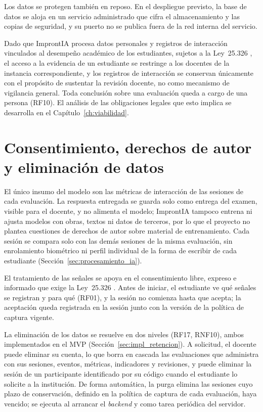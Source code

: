 Los datos se protegen también en reposo. En el despliegue previsto, la base de datos se aloja en un servicio administrado que cifra el almacenamiento y las copias de seguridad, y su puerto no se publica fuera de la red interna del servicio.

Dado que ImprontIA procesa datos personales y registros de interacción vinculados al desempeño académico de los estudiantes, sujetos a la Ley~25.326 \parencite{Argentina2000Ley25326}, el acceso a la evidencia de un estudiante se restringe a los docentes de la instancia correspondiente, y los registros de interacción se conservan únicamente con el propósito de sustentar la revisión docente, no como mecanismo de vigilancia general. Toda conclusión sobre una evaluación queda a cargo de una persona (RF10). El análisis de las obligaciones legales que esto implica se desarrolla en el Capítulo~\ref{ch:viabilidad}.

\section{Consentimiento, derechos de autor y eliminación de datos}
\label{sec:consentimiento_datos}

El único insumo del modelo son las métricas de interacción de las sesiones de cada evaluación. La respuesta entregada se guarda solo como entrega del examen, visible para el docente, y no alimenta el modelo; ImprontIA tampoco entrena ni ajusta modelos con obras, textos ni datos de terceros, por lo que el proyecto no plantea cuestiones de derechos de autor sobre material de entrenamiento. Cada sesión se compara solo con las demás sesiones de la misma evaluación, sin enrolamiento biométrico ni perfil individual de la forma de escribir de cada estudiante (Sección~\ref{sec:procesamiento_ia}).

El tratamiento de las señales se apoya en el consentimiento libre, expreso e informado que exige la Ley~25.326 \parencite{Argentina2000Ley25326}. Antes de iniciar, el estudiante ve qué señales se registran y para qué (RF01), y la sesión no comienza hasta que acepta; la aceptación queda registrada en la sesión junto con la versión de la política de captura vigente.

La eliminación de los datos se resuelve en dos niveles (RF17, RNF10), ambos implementados en el MVP (Sección~\ref{sec:impl_retencion}). A solicitud, el docente puede eliminar su cuenta, lo que borra en cascada las evaluaciones que administra con sus sesiones, eventos, métricas, indicadores y revisiones, y puede eliminar la sesión de un participante identificado por su código cuando el estudiante lo solicite a la institución. De forma automática, la purga elimina las sesiones cuyo plazo de conservación, definido en la política de captura de cada evaluación, haya vencido; se ejecuta al arrancar el \textit{backend} y como tarea periódica del servidor.

